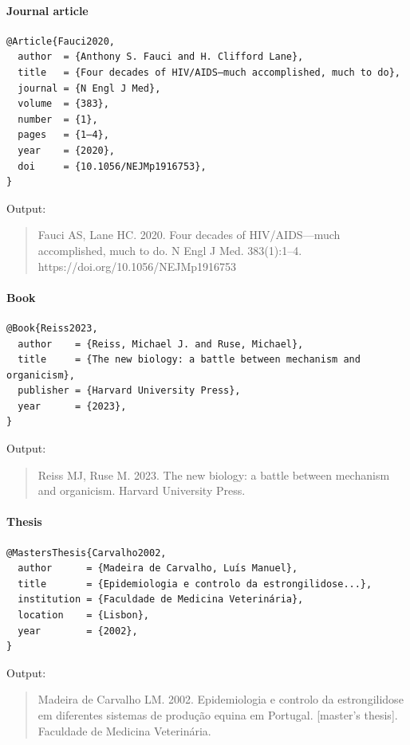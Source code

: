 \documentclass[11pt]{article}
\begin{document}
\paragraph{Journal article}
\begin{verbatim}
@Article{Fauci2020,
  author  = {Anthony S. Fauci and H. Clifford Lane},
  title   = {Four decades of HIV/AIDS—much accomplished, much to do},
  journal = {N Engl J Med},
  volume  = {383},
  number  = {1},
  pages   = {1–4},
  year    = {2020},
  doi     = {10.1056/NEJMp1916753},
}
\end{verbatim}

Output:
\begin{quote}
Fauci AS, Lane HC. 2020. Four decades of HIV/AIDS—much accomplished, much to do. N Engl J Med. 383(1):1–4. https://doi.org/10.1056/NEJMp1916753
\end{quote}

\paragraph{Book}
\begin{verbatim}
@Book{Reiss2023,
  author    = {Reiss, Michael J. and Ruse, Michael},
  title     = {The new biology: a battle between mechanism and organicism},
  publisher = {Harvard University Press},
  year      = {2023},
}
\end{verbatim}

Output:
\begin{quote}
Reiss MJ, Ruse M. 2023. The new biology: a battle between mechanism and organicism. Harvard University Press.
\end{quote}

\paragraph{Thesis}
\begin{verbatim}
@MastersThesis{Carvalho2002,
  author      = {Madeira de Carvalho, Luís Manuel},
  title       = {Epidemiologia e controlo da estrongilidose...},
  institution = {Faculdade de Medicina Veterinária},
  location    = {Lisbon},
  year        = {2002},
}
\end{verbatim}

Output:
\begin{quote}
Madeira de Carvalho LM. 2002. Epidemiologia e controlo da estrongilidose em diferentes sistemas de produção equina em Portugal. [master's thesis]. Faculdade de Medicina Veterinária.
\end{quote}
\end{document}
